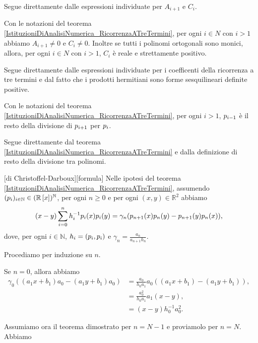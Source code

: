 \Proof Segue direttamente dalle espressioni individuate per $A_{i + 1}$ e $C_i$. \EndProof
\begin{Corollary}
	Con le notazioni del teorema \ref{IstituzioniDiAnalisiNumerica_RicorrenzaATreTermini},
	per ogni $i \in N$ con $i > 1$ abbiamo $A_{i + 1} \neq 0$ e $C_i \neq 0$. Inoltre se tutti i polinomi ortogonali sono monici, allora, per ogni $i \in N$ con $i > 1$, $C_i$ \`e reale e strettamente positivo.
\end{Corollary}
\Proof Segue direttamente dalle espressioni individuate per i coefficenti della ricorrenza a tre termini e dal fatto che i prodotti hermitiani sono forme sesquilineari definite positive. \EndProof
\begin{Corollary}
	Con le notazioni del teorema \ref{IstituzioniDiAnalisiNumerica_RicorrenzaATreTermini},
	per ogni $i > 1$, $p_{i - 1}$ \`e il resto della divisione di $p_{i + 1}$ per $p_i$.
\end{Corollary}
\Proof Segue direttamente dal teorema \ref{IstituzioniDiAnalisiNumerica_RicorrenzaATreTermini} e dalla definizione di resto della divisione tra polinomi. \EndProof
\begin{Theorem}
	\label{IstituzioniDiAnalisiNumerica_Christoffel_Darboux}
	[di Christoffel-Darboux][formula]
	Nelle ipotesi del teorema \ref{IstituzioniDiAnalisiNumerica_RicorrenzaATreTermini}, assumendo $(p_i)_{i \in \mathbb{N}} \in (\mathbb{R} \left [ x \right ])^\mathbb{N}$, per ogni $n \geq 0$ e per ogni $(x,y) \in \mathbb{R}^2$ abbiamo
	\[
	(x - y) \sum_{i = 0}^n h_i^{-1}p_i(x)p_i(y) = \gamma_n (p_{n + 1}(x)p_n(y) - p_{n + 1}(y)p_n(x)),
	\]
	dove, per ogni $i \in \mathbb{N}$, $h_i = \left ( p_i , p_i \right )$ e $\gamma_n = \frac{a_n}{a_{n + 1}h_n}$.
\end{Theorem}
\Proof Procediamo per induzione su $n$.
\par Se $n = 0$, allora abbiamo
\begin{align*}
\gamma_0((a_1x + b_1)a_0 - (a_1y + b_1)a_0)
&= \frac{a_0}{h_0a_1}a_0((a_1x + b_1) - (a_1y + b_1)),\\
&= \frac{a_0^2}{h_0a_1}a_1(x - y),\\
&= (x - y)h_0^{-1}a_0^2.
\end{align*}
\par Assumiamo ora il teorema dimostrato per $n = N - 1$ e proviamolo per $n = N$. Abbiamo
